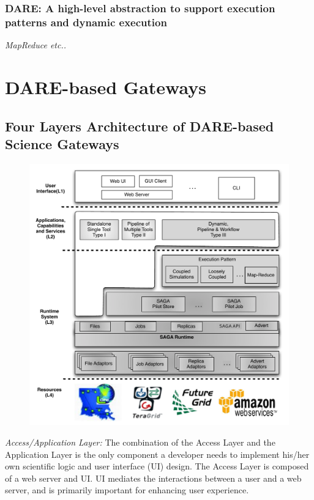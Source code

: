\documentclass[]{article}
\begin{document}
\subsubsection{DARE: A high-level abstraction to support execution
  patterns and dynamic execution} 

{\it MapReduce etc..}

\section{DARE-based Gateways}

\subsection{Four Layers Architecture of DARE-based Science
  Gateways}

\begin{figure}
  \centering
  \includegraphics[scale=0.40]{figures/DARE-gateway-arch.pdf}
  \caption{\small {}}
  \label{fig:dare-arch} 
\end{figure}

\textit{Access/Application Layer:} The combination of the Access Layer
and the Application Layer is the only component a developer needs to
implement his/her own scientific logic and user interface (UI) design.
The Access Layer is composed of a web server and UI.  UI mediates the
interactions between a user and a web server, and is primarily
important for enhancing user experience.
\end{document}
